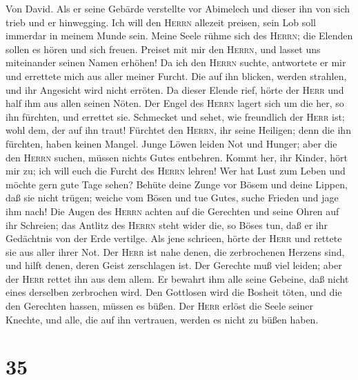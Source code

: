  Von David. Als er seine Gebärde verstellte vor Abimelech
und dieser ihn von sich trieb und er hinwegging. Ich will den
\textsc{Herrn} allezeit preisen, sein Lob soll immerdar in meinem Munde
sein.  Meine Seele rühme sich des \textsc{Herrn}; die
Elenden sollen es hören und sich freuen.  Preiset mit mir
den \textsc{Herrn}, und lasset uns miteinander seinen Namen erhöhen!
 Da ich den \textsc{Herrn} suchte, antwortete er mir und
errettete mich aus aller meiner Furcht.  Die auf ihn
blicken, werden strahlen, und ihr Angesicht wird nicht erröten.
 Da dieser Elende rief, hörte der \textsc{Herr} und half
ihm aus allen seinen Nöten.  Der Engel des \textsc{Herrn}
lagert sich um die her, so ihn fürchten, und errettet sie.
 Schmecket und sehet, wie freundlich der \textsc{Herr}
ist; wohl dem, der auf ihn traut!  Fürchtet den
\textsc{Herrn}, ihr seine Heiligen; denn die ihn fürchten, haben keinen
Mangel.  Junge Löwen leiden Not und Hunger; aber die den
\textsc{Herrn} suchen, müssen nichts Gutes entbehren. 
Kommt her, ihr Kinder, hört mir zu; ich will euch die Furcht des
\textsc{Herrn} lehren!  Wer hat Lust zum Leben und möchte
gern gute Tage sehen?  Behüte deine Zunge vor Bösem und
deine Lippen, daß sie nicht trügen;  weiche vom Bösen und
tue Gutes, suche Frieden und jage ihm nach!  Die Augen
des \textsc{Herrn} achten auf die Gerechten und seine Ohren auf ihr
Schreien;  das Antlitz des \textsc{Herrn} steht wider
die, so Böses tun, daß er ihr Gedächtnis von der Erde vertilge.
 Als jene schrieen, hörte der \textsc{Herr} und rettete
sie aus aller ihrer Not.  Der \textsc{Herr} ist nahe
denen, die zerbrochenen Herzens sind, und hilft denen, deren Geist
zerschlagen ist.  Der Gerechte muß viel leiden; aber der
\textsc{Herr} rettet ihn aus dem allem.  Er bewahrt ihm
alle seine Gebeine, daß nicht eines derselben zerbrochen wird.
 Den Gottlosen wird die Bosheit töten, und die den
Gerechten hassen, müssen es büßen.  Der \textsc{Herr}
erlöst die Seele seiner Knechte, und alle, die auf ihn vertrauen, werden
es nicht zu büßen haben.

\hypertarget{section-34}{%
\section{35}\label{section-34}}


